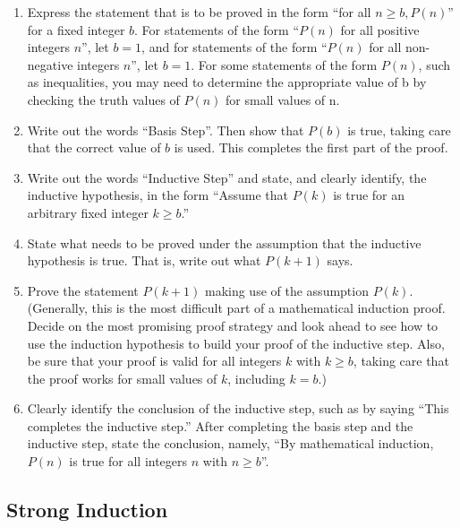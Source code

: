 \begin{enumerate}
	\item Express the statement that is to be proved in the form ``for all \(  	n \geq b, P(n) \)'' for a fixed integer \( b \). For statements of the form ``\(   P(n) \) for all positive integers \( n \)'', let \( b = 1\), and for statements of the form ``\( P(n) \) for all non-negative integers \( n \)'', let  \( b = 1 \). For some statements of the form \( P(n) \), such as inequalities, you may need to determine the appropriate value of b by checking the truth values of \( P(n) \)  for small values of n.

	\item 	Write out the words ``Basis Step''. Then show that \( P(b) \) is true, taking care that the correct value of \( b \)  is used. This completes the first part of the proof.
	
	
	\item Write out the words ``Inductive Step'' and state, and clearly identify, the inductive hypothesis, in the form ``Assume that \( P(k) \)  is true for an arbitrary fixed integer \(  k \geq b \).''

	\item  State what needs to be proved under the assumption that the inductive hypothesis is true. That is, write out what \( 	 P(k + 1) \) says.
	
	
	\item Prove the statement \( P(k + 1) \) making use of the assumption \( 	 P(k) \). (Generally, this is the most difficult part of a mathematical induction proof. Decide on the most promising proof strategy and look ahead to see how to use the induction hypothesis to build your proof of the inductive step. Also, be sure that your proof is valid for all integers \( k \)  with \(  k \geq b \), taking care that the proof works for small values of \( k \), including \( k=b \).)
	
	\item 	Clearly identify the conclusion of the inductive step, such as by saying ``This completes the inductive step.'' After completing the basis step and the inductive step, state the conclusion, namely, ``By mathematical induction, \( P(n) \)  is true for all integers \( n \)  with \(  n \geq b \)''.
\end{enumerate}

\subsection{Strong Induction}

